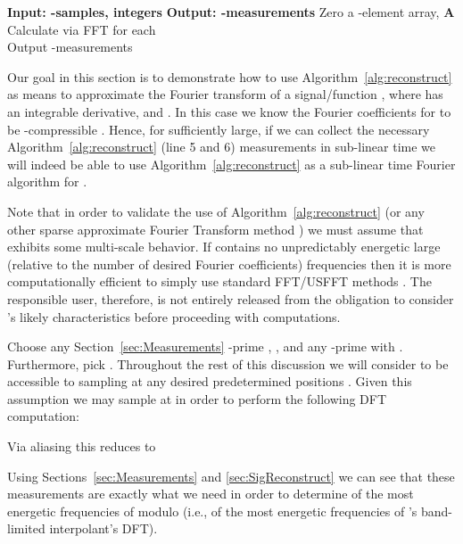 \documentclass{article}
\begin{document}
\begin{algorithm}[tb]
\begin{algorithmic}[1]
\caption{} \label{alg:fmeasure}
\STATE \textbf{Input:  -samples, integers } 
\STATE \textbf{Output:  -measurements}
\STATE Zero a -element array, \textbf{A} 
		\STATE 
		\STATE Calculate  via FFT
		\STATE  for each 
	\ENDFOR
\ENDFOR \\
\STATE Output -measurements
\end{algorithmic}
\end{algorithm}

Our goal in this section is to demonstrate how to use Algorithm~\ref{alg:reconstruct} as means to approximate the Fourier transform of a signal/function , where   has an integrable  derivative, and  .  In this case we know the Fourier coefficients for  to be -compressible \cite{BoydAl,FourierCont}.  Hence, for  sufficiently large, if we can collect the necessary Algorithm~\ref{alg:reconstruct} (line 5 and 6) measurements in sub-linear time we will indeed be able to use Algorithm~\ref{alg:reconstruct} as a sub-linear time Fourier algorithm for .  

Note that in order to validate the use of Algorithm~\ref{alg:reconstruct} (or any other sparse approximate Fourier Transform method \cite{AAFFT1,AAFFT2}) we must assume that  exhibits some multi-scale behavior.  If  contains no unpredictably energetic large (relative to the number of desired Fourier coefficients) frequencies then it is more computationally efficient to simply use standard FFT/USFFT methods \cite{FFT,AUSFFTrev,AUSFFT,USFFT1,USFFT2}.  The responsible user, therefore, is not entirely released from the obligation to consider 's likely characteristics before proceeding with computations.

Choose any Section~\ref{sec:Measurements} -prime , , and any -prime  with .  Furthermore, pick .  Throughout the rest of this discussion we will consider  to be accessible to sampling at any desired predetermined positions .  Given this assumption we may sample  at  in order to perform the following DFT computation:

Via aliasing \cite{BoydAl} this reduces to

Using Sections~\ref{sec:Measurements} and \ref{sec:SigReconstruct} we can see that these measurements are exactly what we need in order to determine  of the most energetic frequencies of  modulo  (i.e.,  of the most energetic frequencies of 's band-limited interpolant's DFT).  
\end{document}
